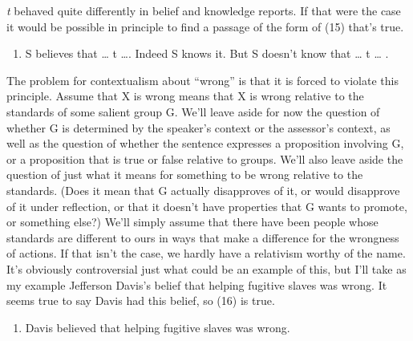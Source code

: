 \textit{{t}}{ behaved quite differently in belief and knowledge reports. If that were the case it would be possible in principle to find a passage of the form of (15) that's true.}

\begin{enumerate}
\renewcommand{\labelenumi}{(\arabic{enumi})}
\setcounter{enumi}{14}
\item {S believes that {\dots} t {\dots}. Indeed S knows it. But S doesn't know that {\dots} t {\dots} .}
\end{enumerate}


{The problem for contextualism about ``wrong'' is that it is forced to violate this principle. Assume that X is wrong means that X is wrong relative to the standards of some salient group G. We'll leave aside for now the question of whether G is determined by the speaker's context or the assessor's context, as well as the question of whether the sentence expresses a proposition involving G, or a proposition that is true or false relative to groups. We'll also leave aside the question of just what it means for something to be wrong relative to the standards. (Does it mean that G actually disapproves of it, or would disapprove of it under reflection, or that it doesn't have properties that G wants to promote, or something else?) We'll simply assume that there have been people whose standards are different to ours in ways that make a difference for the wrongness of actions. If that isn't the case, we hardly have a relativism worthy of the name. It's obviously controversial just what could be an example of this, but I'll take as my example Jefferson Davis's belief that helping fugitive slaves was wrong. It seems true to say Davis had this belief, so (16) is true.}

\begin{enumerate}
\renewcommand{\labelenumi}{(\arabic{enumi})}
\setcounter{enumi}{15}
\item {Davis believed that helping fugitive slaves was wrong.}
\end{enumerate}

